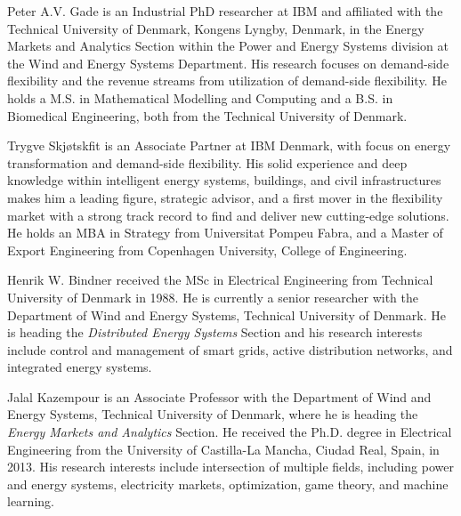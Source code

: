 \documentclass[lettersize,journal]{IEEEtran}
\begin{document}





% 






    
\newpage

\begin{IEEEbiographynophoto}{Peter A.V. Gade}
    is an Industrial PhD researcher at IBM and affiliated with the Technical University of Denmark, Kongens Lyngby, Denmark, in the Energy Markets and Analytics Section within the Power and Energy Systems division at the Wind and Energy Systems Department. His research focuses on demand-side flexibility and the revenue streams from utilization of demand-side flexibility. He holds a M.S. in Mathematical Modelling and Computing and a B.S. in Biomedical Engineering, both from the Technical University of Denmark.
\end{IEEEbiographynophoto}
\begin{IEEEbiographynophoto}{Trygve Skjøtskfit}
    is an Associate Partner at IBM Denmark, with focus on energy transformation and demand-side flexibility. His solid experience and deep knowledge within intelligent energy systems, buildings, and civil infrastructures makes him a leading figure, strategic advisor, and a first mover in the flexibility market with a strong track record to find and deliver new cutting-edge solutions. He holds an MBA in Strategy from Universitat Pompeu Fabra, and a Master of Export Engineering from Copenhagen University, College of Engineering.
\end{IEEEbiographynophoto}
\begin{IEEEbiographynophoto}{Henrik W. Bindner}
    received the MSc in Electrical Engineering from Technical University of Denmark in 1988. He is currently a senior researcher with the Department of Wind and Energy Systems, Technical University of Denmark. He is heading the \textit{Distributed Energy Systems} Section and his research interests include control and management of smart grids, active distribution networks, and integrated energy systems.
\end{IEEEbiographynophoto}
\begin{IEEEbiographynophoto}{Jalal Kazempour}
    is an Associate Professor with the Department of Wind and Energy Systems, Technical University of Denmark, where he is heading the \textit{Energy Markets and Analytics} Section. He received the Ph.D. degree in Electrical Engineering from the University of Castilla-La Mancha, Ciudad Real, Spain, in 2013. His research interests include intersection of multiple fields, including power and energy systems, electricity markets, optimization, game theory, and machine learning.
\end{IEEEbiographynophoto}


\vfill
\end{document}
